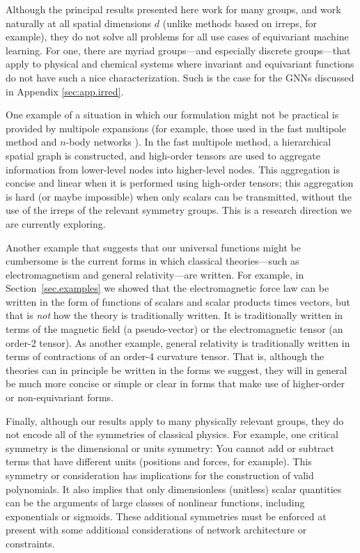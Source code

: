 \documentclass{article}
\theoremstyle{Hogg}
\begin{document}
Although the principal results presented here work for many groups, and work naturally at all spatial dimensions $d$ (unlike methods based on irreps, for example), they do not solve all problems for all use cases of equivariant machine learning.
For one, there are myriad groups---and especially discrete groups---that apply to physical and chemical systems where invariant and equivariant functions do not have such a nice characterization. Such is the case for the GNNs discussed in Appendix \ref{sec:app.irred}. 

One example of a situation in which our formulation might not be practical is provided by multipole expansions (for example, those used in the fast multipole method \cite{beatson1997short} and $n$-body networks \cite{kondor2018n}).
In the fast multipole method, a hierarchical spatial graph is constructed, and high-order tensors are used to aggregate information from lower-level nodes into higher-level nodes.
This aggregation is concise and linear when it is performed using high-order tensors; this aggregation is hard (or maybe impossible) when only scalars can be transmitted, without the use of the irreps of the relevant symmetry groups. This is a research direction we are currently exploring.

Another example that suggests that our universal functions might be cumbersome is the current forms in which classical theories---such as electromagnetism and general relativity---are written.
For example, in Section~\ref{sec.examples} we showed that the electromagnetic force law can be written in the form of functions of scalars and scalar products times vectors, but that is \emph{not} how the theory is traditionally written.
It is traditionally written in terms of the magnetic field (a pseudo-vector) or the electromagnetic tensor (an order-2 tensor).
As another example, general relativity is traditionally written in terms of contractions of an order-4 curvature tensor.
That is, although the theories can in principle be written in the forms we suggest, they will in general be much more concise or simple or clear in forms that make use of higher-order or non-equivariant forms.

Finally, although our results apply to many physically relevant groups, they do not encode all of the symmetries of classical physics.
For example, one critical symmetry is the dimensional or units symmetry:
You cannot add or subtract terms that have different units (positions and forces, for example).
This symmetry or consideration has implications for the construction of valid polynomials.
It also implies that only dimensionless (unitless) scalar quantities can be the arguments of large classes of nonlinear functions, including exponentials or sigmoids.
These additional symmetries must be enforced at present with some additional considerations of network architecture or constraints.
\end{document}
